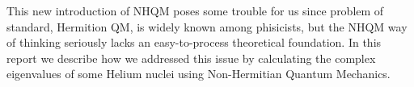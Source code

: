 This new introduction of NHQM poses some trouble for us since problem of standard, Hermition QM, is widely known among phisicists, but the NHQM way of thinking seriously lacks an easy-to-process theoretical foundation.
In this report we describe how we addressed this issue by calculating the complex eigenvalues of some Helium nuclei using Non-Hermitian Quantum Mechanics.